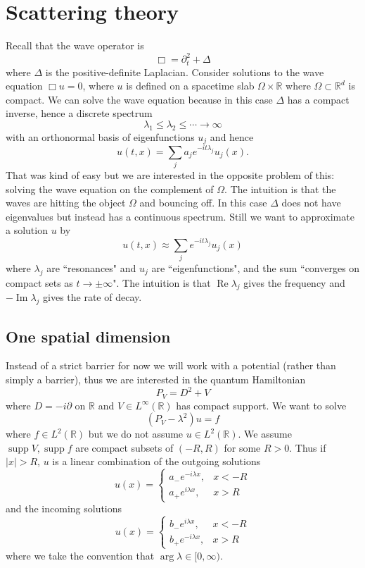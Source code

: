 \documentclass[12pt]{report}
\newcommand{\RR}{\mathbb{R}}
\newcommand{\supp}{\operatorname{supp}}
\renewcommand{\Re}{\operatorname{Re}}
\renewcommand{\Im}{\operatorname{Im}}
\theoremstyle{definition}
\begin{document}
\chapter{Scattering theory}
Recall that the wave operator is
$$\Box = \partial_t^2 + \Delta$$
where $\Delta$ is the positive-definite Laplacian. Consider solutions to the wave equation $\Box u = 0$, where $u$ is defined on a spacetime slab $\Omega \times \RR$ where $\Omega \subset \RR^d$ is compact.
We can solve the wave equation because in this case $\Delta$ has a compact inverse, hence a discrete spectrum
$$\lambda_1 \leq \lambda_2 \leq \cdots \to \infty$$
with an orthonormal basis of eigenfunctions $u_j$ and hence
$$u(t, x) = \sum_j a_j e^{-it\lambda_j} u_j(x).$$
That was kind of easy but we are interested in the opposite problem of this: solving the wave equation on the complement of $\Omega$.
The intuition is that the waves are hitting the object $\Omega$ and bouncing off.
In this case $\Delta$ does not have eigenvalues but instead has a continuous spectrum.
Still we want to approximate a solution $u$ by
$$u(t, x) \approx \sum_j e^{-it\lambda_j} u_j(x)$$
where $\lambda_j$ are ``resonances" and $u_j$ are ``eigenfunctions", and the sum ``converges on compact sets as $t \to \pm \infty$".
The intuition is that $\Re \lambda_j$ gives the frequency and $-\Im \lambda_j$ gives the rate of decay.

\section{One spatial dimension}
Instead of a strict barrier for now we will work with a potential (rather than simply a barrier), thus we are interested in the quantum Hamiltonian
$$P_V = D^2 + V$$
where $D = -i\partial$ on $\RR$ and $V \in L^\infty(\RR)$ has compact support.
We want to solve
$$(P_V - \lambda^2)u = f$$
where $f \in L^2(\RR)$ but we do not assume $u \in L^2(\RR)$.
We assume $\supp V, \supp f$ are compact subsets of $(-R, R)$ for some $R > 0$.
Thus if $|x| > R$, $u$ is a linear combination of the outgoing solutions
$$
u(x) = \begin{cases}
a_- e^{-i\lambda x}, &x<-R\\
a_+ e^{i\lambda x}, &x>R
\end{cases}
$$
and the incoming solutions
$$
u(x) = \begin{cases}
b_- e^{i\lambda x}, &x<-R\\
b_+ e^{-i\lambda x}, &x>R
\end{cases}
$$
where we take the convention that $\arg \lambda \in [0, \infty)$.
\end{document}
